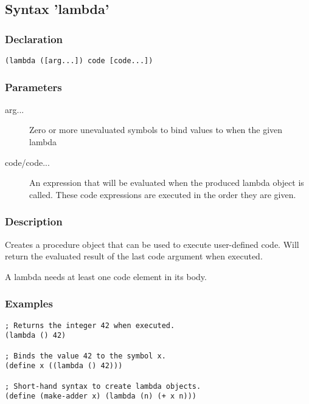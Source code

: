 \subsection{Syntax 'lambda'}
\label{builtins/lambda}

\subsubsection*{Declaration}
\begin{lstlisting}
(lambda ([arg...]) code [code...])
\end{lstlisting}

\subsubsection*{Parameters}
\begin{description}
	\item[arg...] Zero or more unevaluated symbols to bind values to when the given lambda
	\item[code/code...] An expression that will be evaluated when the produced lambda object is called. These code expressions are executed in the order they are given.
\end{description}

\subsubsection*{Description}
Creates a procedure object that can be used to execute user-defined code. Will return the evaluated result of the last code argument when executed.

A lambda needs at least one code element in its body.

\subsubsection*{Examples}
\begin{lstlisting}
; Returns the integer 42 when executed.
(lambda () 42)

; Binds the value 42 to the symbol x.
(define x ((lambda () 42)))

; Short-hand syntax to create lambda objects.
(define (make-adder x) (lambda (n) (+ x n)))
\end{lstlisting}

